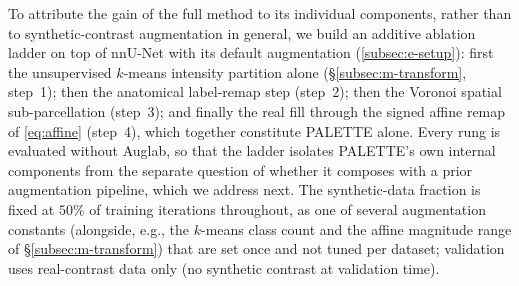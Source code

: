 
To attribute the gain of the full method to its individual components,
rather than to synthetic-contrast augmentation in general, we build an
additive ablation ladder on top of nnU-Net with its default augmentation
(\cref{subsec:e-setup}): first the unsupervised $k$-means intensity partition
alone (\S\ref{subsec:m-transform}, step~1); then the anatomical label-remap
step (step~2); then the Voronoi spatial sub-parcellation (step~3); and
finally the real fill through the signed affine remap of \cref{eq:affine} (step~4), which
together constitute PALETTE alone. Every rung is evaluated without
Auglab, so
that the ladder isolates PALETTE's own internal components from the
separate question of whether it composes with a prior augmentation
pipeline, which we address next. The synthetic-data fraction is fixed at
$50\%$ of training iterations throughout, as one of several augmentation
constants (alongside, e.g., the $k$-means class count and the affine
magnitude range of \S\ref{subsec:m-transform}) that are set once and not
tuned per dataset; validation uses real-contrast data only (no synthetic
contrast at validation time).

